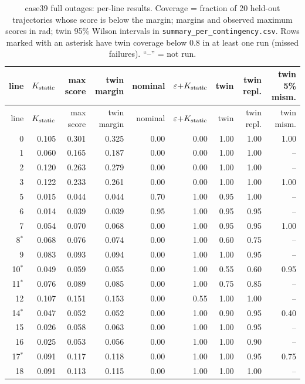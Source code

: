 \begin{longtable}{@{}rrrrrrrrr@{}}
\caption{case39 full outages: per-line results. Coverage = fraction of 20 held-out trajectories whose score is below the margin; margins and observed maximum scores in rad; twin 95\% Wilson intervals in \texttt{summary\_per\_contingency.csv}. Rows marked with an asterisk have twin coverage below 0.8 in at least one run (missed failures). ``--'' = not run.}\\
\toprule
line & $K_{\rm static}$ & max score & twin margin & nominal & $\varepsilon{+}K_{\rm static}$ & twin & twin repl. & twin 5\% mism.\\
\midrule\endfirsthead
\toprule line & $K_{\rm static}$ & max score & twin margin & nominal & $\varepsilon{+}K_{\rm static}$ & twin & twin repl. & twin mism.\\\midrule\endhead
0 & 0.105 & 0.301 & 0.325 & 0.00 & 0.00 & 1.00 & 1.00 & 1.00\\
1 & 0.060 & 0.165 & 0.187 & 0.00 & 0.00 & 1.00 & 1.00 & --\\
2 & 0.120 & 0.263 & 0.279 & 0.00 & 0.00 & 1.00 & 1.00 & --\\
3 & 0.122 & 0.233 & 0.261 & 0.00 & 0.00 & 1.00 & 1.00 & 1.00\\
5 & 0.015 & 0.044 & 0.044 & 0.70 & 1.00 & 0.95 & 1.00 & --\\
6 & 0.014 & 0.039 & 0.039 & 0.95 & 1.00 & 0.95 & 0.95 & --\\
7 & 0.054 & 0.070 & 0.068 & 0.00 & 1.00 & 0.95 & 0.95 & 1.00\\
8$^*$ & 0.068 & 0.076 & 0.074 & 0.00 & 1.00 & 0.60 & 0.75 & --\\
9 & 0.083 & 0.093 & 0.094 & 0.00 & 1.00 & 1.00 & 0.95 & --\\
10$^*$ & 0.049 & 0.059 & 0.055 & 0.00 & 1.00 & 0.55 & 0.60 & 0.95\\
11$^*$ & 0.076 & 0.089 & 0.085 & 0.00 & 1.00 & 0.75 & 0.85 & --\\
12 & 0.107 & 0.151 & 0.153 & 0.00 & 0.55 & 1.00 & 1.00 & --\\
14$^*$ & 0.047 & 0.052 & 0.052 & 0.00 & 1.00 & 0.90 & 0.95 & 0.40\\
15 & 0.026 & 0.058 & 0.063 & 0.00 & 1.00 & 1.00 & 0.95 & --\\
16 & 0.025 & 0.053 & 0.056 & 0.00 & 1.00 & 1.00 & 0.90 & --\\
17$^*$ & 0.091 & 0.117 & 0.118 & 0.00 & 1.00 & 1.00 & 0.95 & 0.75\\
18 & 0.091 & 0.113 & 0.115 & 0.00 & 1.00 & 1.00 & 1.00 & --\\

\end{longtable}
